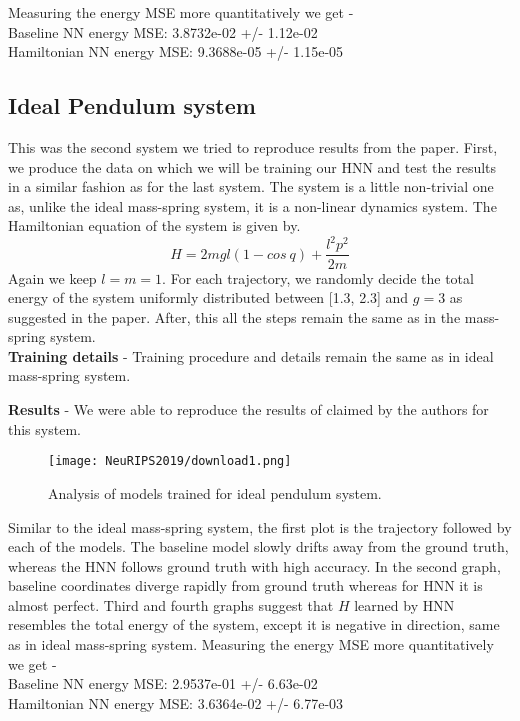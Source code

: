 \documentclass{article}
\begin{document}
Measuring the energy MSE more quantitatively we get -\\
Baseline NN energy MSE: \quad 3.8732e-02 +/- 1.12e-02\\
Hamiltonian NN energy MSE: \quad 9.3688e-05 +/- 1.15e-05

\subsection{Ideal Pendulum system}
This was the second system we tried to reproduce results from the paper. First, we produce the data on which we will be training our HNN and test the results in a similar fashion as for the last system. The system is a little non-trivial one as, unlike the ideal mass-spring system, it is a non-linear dynamics system. The Hamiltonian equation of the system is given by.
\begin{equation}
H = 2mgl(1 - cos\:q) + \frac{l^2 p^2}{2m}
\end{equation}
Again we keep \(l = m = 1\). For each trajectory, we randomly decide the total energy of the system uniformly distributed between [1.3, 2.3] and \(g = 3\) as suggested in the paper. After, this all the steps remain the same as in the mass-spring system.\\
\textbf{Training details} - Training procedure and details remain the same as in ideal mass-spring system.

\textbf{Results} - We were able to reproduce the results of claimed by the authors for this system.
\begin{figure}[htp]
    \centering
    \texttt{[image: NeuRIPS2019/download1.png]}
    \caption{Analysis of models trained for ideal pendulum system.}
    \label{fig:galaxy}
\end{figure}

Similar to the ideal mass-spring system, the first plot is the trajectory followed by each of the models. The baseline model slowly drifts away from the ground truth, whereas the HNN follows ground truth with high accuracy. In the second graph, baseline coordinates diverge rapidly from ground truth whereas for HNN it is almost perfect. Third and fourth graphs suggest that \(H\) learned by HNN resembles the total energy of the system, except it is negative in direction, same as in ideal mass-spring system.
Measuring the energy MSE more quantitatively we get -\\
Baseline NN energy MSE: 2.9537e-01 +/- 6.63e-02\\
Hamiltonian NN energy MSE: 3.6364e-02 +/- 6.77e-03
\end{document}
